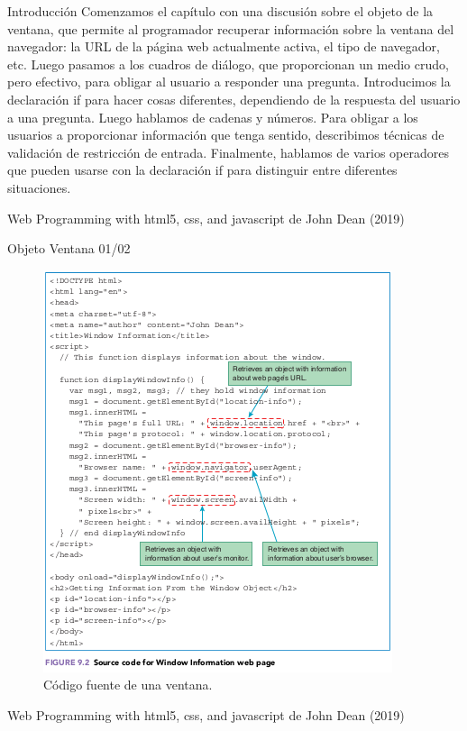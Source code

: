 \begin{frame}{Introducción}
\justifying
Comenzamos el capítulo con una discusión sobre el objeto de la ventana, que permite al programador recuperar información sobre la ventana del navegador: la URL de la página web actualmente activa, el tipo de navegador, etc. Luego pasamos a los cuadros de diálogo, que proporcionan un medio crudo, pero efectivo, para obligar al usuario a responder una pregunta. Introducimos la declaración if para hacer cosas diferentes, dependiendo de la respuesta del usuario a una pregunta. Luego hablamos de cadenas y números. Para obligar a los usuarios a proporcionar información que tenga sentido, describimos técnicas de validación de restricción de entrada. Finalmente, hablamos de varios operadores que pueden usarse con la declaración if para distinguir entre diferentes situaciones.


{\tiny Web Programming with html5, css, and javascript de John Dean (2019)}
\end{frame}

\begin{frame}{Objeto Ventana 01/02}
\justifying
\begin{figure}[H]
\centering
\includegraphics[scale=0.4]{Section_Files/images/Sec02/01.png}
\caption{Código fuente de una ventana.}
\end{figure}


{\tiny Web Programming with html5, css, and javascript de John Dean (2019)}
\end{frame}

